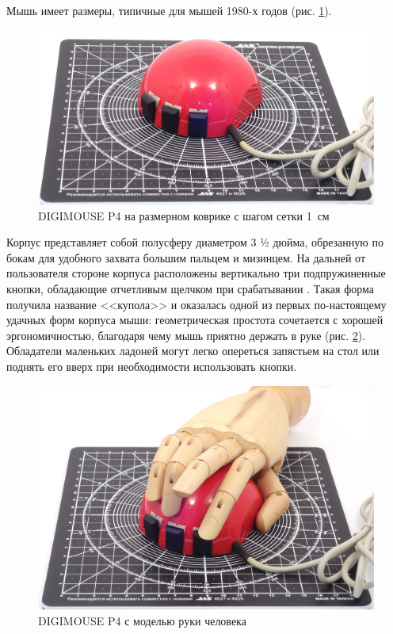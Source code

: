 \documentclass[11pt, a4paper]{article}
\begin{document}
Мышь имеет размеры, типичные для мышей 1980-х годов (рис. \ref{fig:DIGIMOUSEP4Size}). 

\begin{figure}[h]
    \centering
    \includegraphics[scale=0.5]{1982_depraz_digimouse/size_30.jpg}
    \caption{DIGIMOUSE P4 на размерном коврике с шагом сетки 1~см}
    \label{fig:DIGIMOUSEP4Size}
\end{figure}

Корпус представляет собой полусферу диаметром 3 ½ дюйма, обрезанную по бокам для удобного захвата большим пальцем и мизинцем. На дальней от пользователя стороне корпуса расположены вертикально три подпружиненные кнопки, обладающие отчетливым щелчком при срабатывании \cite{oldmouse}. Такая форма получила название <<купола>> и оказалась одной из первых по-настоящему удачных форм корпуса мыши: геометрическая простота сочетается с хорошей эргономичностью, благодаря чему мышь приятно держать в руке (рис. \ref{fig:DIGIMOUSEP4Hand}). Обладатели маленьких ладоней могут легко опереться запястьем на стол или поднять его вверх при необходимости использовать кнопки.

\begin{figure}[h]
    \centering
    \includegraphics[scale=0.5]{1982_depraz_digimouse/hand_30.jpg}
    \caption{DIGIMOUSE P4 с моделью руки человека}
    \label{fig:DIGIMOUSEP4Hand}
\end{figure}
\end{document}
